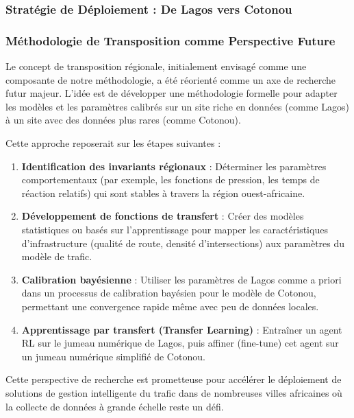 \subsubsection{Stratégie de Déploiement : De Lagos vers Cotonou}


\subsubsection{Méthodologie de Transposition comme Perspective Future}
Le concept de transposition régionale, initialement envisagé comme une composante de notre méthodologie, a été réorienté comme un axe de recherche futur majeur. L'idée est de développer une méthodologie formelle pour adapter les modèles et les paramètres calibrés sur un site riche en données (comme Lagos) à un site avec des données plus rares (comme Cotonou).

Cette approche reposerait sur les étapes suivantes :
\begin{enumerate}
    \item \textbf{Identification des invariants régionaux} : Déterminer les paramètres comportementaux (par exemple, les fonctions de pression, les temps de réaction relatifs) qui sont stables à travers la région ouest-africaine.
    \item \textbf{Développement de fonctions de transfert} : Créer des modèles statistiques ou basés sur l'apprentissage pour mapper les caractéristiques d'infrastructure (qualité de route, densité d'intersections) aux paramètres du modèle de trafic.
    \item \textbf{Calibration bayésienne} : Utiliser les paramètres de Lagos comme a priori dans un processus de calibration bayésien pour le modèle de Cotonou, permettant une convergence rapide même avec peu de données locales.
    \item \textbf{Apprentissage par transfert (Transfer Learning)} : Entraîner un agent RL sur le jumeau numérique de Lagos, puis affiner (fine-tune) cet agent sur un jumeau numérique simplifié de Cotonou.
\end{enumerate}

Cette perspective de recherche est prometteuse pour accélérer le déploiement de solutions de gestion intelligente du trafic dans de nombreuses villes africaines où la collecte de données à grande échelle reste un défi.

